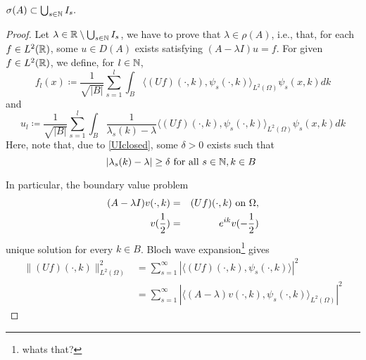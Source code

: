 	
\begin{theorem}
	$\sigma(A) \subset \bigcup_{s \in \mathbb{N}} I_{s}.$

	\begin{proof}
		Let $\lambda \in \mathbb{R} \setminus \bigcup_{s \in \mathbb{N}} I_{s}$, we have to prove that $\lambda \in \rho(A)$, i.e., that, for each $f \in L^{2}(\mathbb{R})$, some $u \in D(A)$ exists satisfying $(A-\lambda I)u = f$. For given $f \in L^{2}(\mathbb{R})$, we define, for $l \in \mathbb{N}$, 
			\[ f_{l}(x) \coloneqq \frac{1}{\sqrt{|B|}} \sum_{s=1}^{l} \int_{B} \langle (Uf)(\cdot, k), \psi_{s}(\cdot, k)\rangle_{L^{2}(\Omega)} \psi_{s}(x,k) dk \]
			and
			\begin{equation}
				u_{l} \coloneqq \frac{1}{\sqrt{|B|}} \sum_{s=1}^{l} \int_{B} \frac{1}{\lambda_{s}(k) - \lambda} \langle (Uf)(\cdot, k), \psi_{s}(\cdot, k)\rangle_{L^{2}(\Omega)} \psi_{s}(x, k) dk \label{ul}
			\end{equation} 
		Here, note that, due to \ref{UIclosed}, some $\delta > 0$ exists such that
			\begin{equation}
				|\lambda_{s}(k) - \lambda| \geq \delta \text{ for all } s \in \N, k \in B \label{lambda-distance}
			\end{equation}

		In particular, the boundary value problem
		\begin{eqnarray}
			(A - \lambda I) v(\cdot, k) & = & (Uf)(\cdot, k) \text{ on } \Omega, \label{3.33} \\
			v(\frac{1}{2}) & = & e^{ik} v(-\frac{1}{2}) \notag
		\end{eqnarray}
		unique solution for every $k \in B$. Bloch wave expansion\footnote{whats that?} gives 
		\begin{align*}
			\| (Uf)(\cdot, k)\|^{2}_{L^{2}(\Omega)} & = \sum_{s=1}^{\infty} |\langle (Uf)(\cdot, k), \psi_{s}(\cdot, k)\rangle|^{2} \\
			& = \sum_{s=1}^{\infty}|\langle (A - \lambda) v(\cdot, k), \psi_{s}(\cdot, k)\rangle_{L^{2}(\Omega)}|^{2}
		\end{align*}


\end{proof}
\end{theorem}
